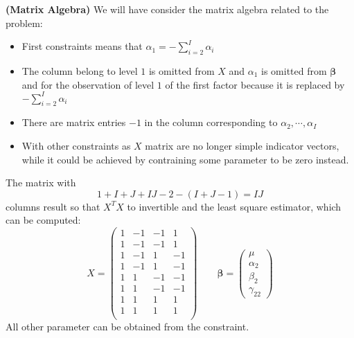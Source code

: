 \begin{remark}{\textbf{(Matrix Algebra)}}
    We will have consider the matrix algebra related to the problem:
    \begin{itemize}
        \item First constraints means that $\alpha_1 = -\sum^I_{i=2}\alpha_i$
        \item The column belong to level $1$ is omitted from $X$ and $\alpha_1$ is omitted from $\boldsymbol \beta$ and for the observation of level $1$ of the first factor because it is replaced by $-\sum^I_{i=2}\alpha_i$
        \item There are matrix entries $-1$ in the column corresponding to $\alpha_2,\cdots,\alpha_I$
        \item With other constraints as $X$ matrix are no longer simple indicator vectors, while it could be achieved by contraining some parameter to be zero instead. 
    \end{itemize}
    The matrix with 
    \begin{equation*}
        1 + I + J + IJ - 2 - (I+J-1) = IJ
    \end{equation*}
    columns result so that $X^TX$ to invertible and the least square estimator, which can be computed:
    \begin{equation*}
        X = \begin{pmatrix}
            1 & -1 & -1 & 1 \\
            1 & -1 & -1 & 1 \\
            1 & -1 & 1 & -1 \\
            1 & -1 & 1 & -1 \\
            1 & 1 & -1 & -1 \\
            1 & 1 & -1 & -1 \\
            1 & 1 & 1 & 1 \\
            1 & 1 & 1 & 1 \\
        \end{pmatrix} \qquad \boldsymbol \beta = \begin{pmatrix}
            \mu \\ \alpha_2 \\ \beta_2 \\ \gamma_{22}
        \end{pmatrix}
    \end{equation*}
    All other parameter can be obtained from the constraint. 
\end{remark}

